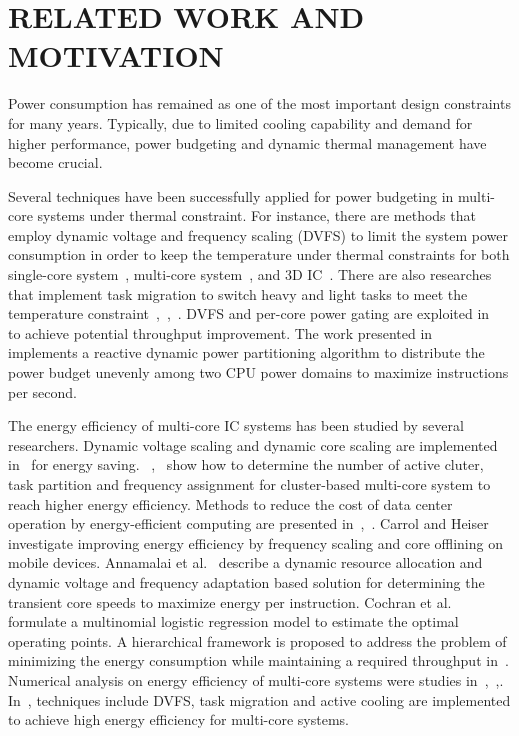 \section{RELATED WORK AND MOTIVATION}
\label{sec:related_works}
Power consumption has remained as one of the most important design constraints for many years. Typically, due to limited cooling capability and demand for higher performance, power budgeting and dynamic thermal management have become crucial.

Several techniques have been successfully applied for power budgeting in multi-core systems under thermal constraint. For instance, there are methods that employ dynamic voltage and frequency scaling (DVFS) to limit the system power consumption in order to keep the temperature under thermal constraints for both single-core system~\cite{Skadron:MICRO'03}, multi-core system~\cite{Jayaseelan:ICCAD'09}, and 3D IC~\cite{Coskun:DATE'09}. There are also researches that implement task migration to switch heavy and light tasks to meet the temperature constraint~\cite{Ge:DAC'10},~\cite{Chantem:TVLSI'11},~\cite{Liu:DATE'12}. DVFS and per-core power gating are exploited in~\cite{Lee:TVLSI'12} to achieve potential throughput improvement. The work presented in~\cite{Kultursay:CHSCSS'12} implements a reactive dynamic power partitioning 
algorithm to distribute the power budget unevenly among two CPU power domains to maximize instructions per second. %

The energy efficiency of multi-core IC systems has been studied by several researchers. Dynamic voltage scaling and dynamic core scaling are implemented in~\cite{Seo:TPDS'08} for energy saving. ~\cite{Majzoub:TCAD'10},~\cite{Kong:DATE'11} show how to determine the number of active cluter, task partition and frequency assignment for cluster-based multi-core system to reach higher energy efficiency. Methods to reduce the cost of data center operation by energy-efficient computing are presented in~\cite{Pedram:TCAD'12},~\cite{Wang:access'17}. Carrol and Heiser~\cite{Carroll:RTAS'14} investigate improving energy efficiency by frequency scaling and core offlining on mobile devices. Annamalai et al.~\cite{Annamalai:ISVLSI'14} describe a dynamic resource allocation and dynamic voltage and frequency adaptation based solution for determining the transient core speeds to maximize energy per instruction. Cochran et al.~\cite{Cochran:ICCAD'11} formulate a multinomial logistic regression model to estimate the optimal operating points. A hierarchical framework is proposed to address the problem of minimizing the energy consumption while maintaining a required throughput in~\cite{Ghasemazar:ISCAS'10}. Numerical analysis on energy efficiency of multi-core systems were studies in~\cite{Woo:Computer'08},~\cite{Hill:Computer'08},\cite{Sun:JPDC'10}. In~\cite{Hanumaiah:TCOMP'14}, techniques include DVFS, task migration and active cooling are implemented to achieve high energy efficiency for multi-core systems.

